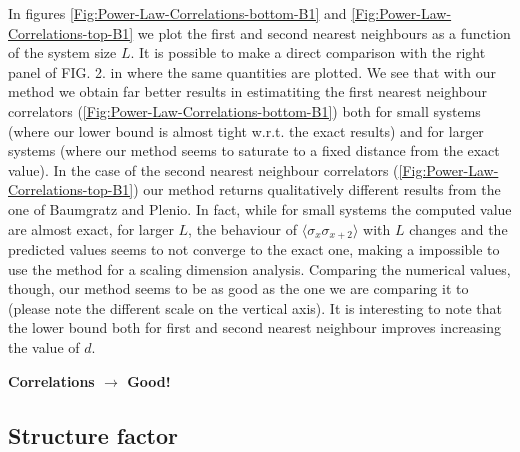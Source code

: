 \documentclass[10pt,a4paper,twoside,twocolumn]{revtex4-1}
\begin{document}
In figures \ref{Fig:Power-Law-Correlations-bottom-B1} and \ref{Fig:Power-Law-Correlations-top-B1} we plot the first and second nearest neighbours as a function of the system size $L$. It is possible to make a direct comparison with the right panel of FIG. 2. in \cite{baumgratz2012}  where the same quantities are plotted. We see that with our method we obtain far better results in estimatiting the first nearest neighbour correlators (\ref{Fig:Power-Law-Correlations-bottom-B1}) both for small systems (where our lower bound is almost tight w.r.t. the exact results) and for larger systems (where our method seems to saturate to a fixed distance from the exact value). 
In the case of the second nearest neighbour correlators (\ref{Fig:Power-Law-Correlations-top-B1}) our method returns qualitatively different results from the one of Baumgratz and Plenio. In fact, while for small systems the computed value are almost exact, for larger $L$, the behaviour of $\langle \sigma_x \sigma_{x+2} \rangle$ with $L$ changes and the predicted values seems to not converge to the exact one, making a impossible to use the method for a scaling dimension analysis. Comparing the numerical values, though, our method seems to be as good as the one we are comparing it to (please note the different scale on the vertical axis).
It is interesting to note that the lower bound both for first and second nearest neighbour improves increasing the value of $d$.

\textbf{Correlations $\rightarrow$ Good!}

\subsection{Structure factor}
\end{document}
